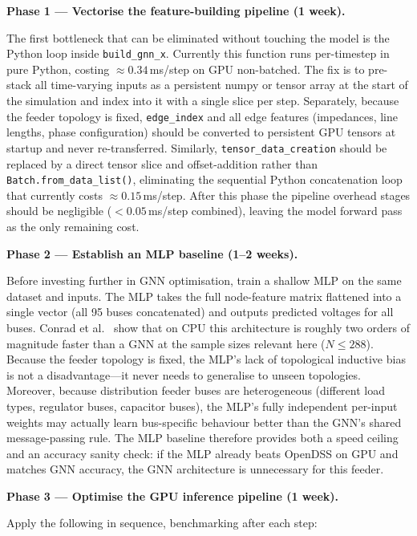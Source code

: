 \documentclass[11pt]{article}
\begin{document}
\medskip
\noindent\textbf{Phase 1 --- Vectorise the feature-building pipeline (1 week).}

The first bottleneck that can be eliminated without touching the model is
the Python loop inside \texttt{build\_gnn\_x}.  Currently this function
runs per-timestep in pure Python, costing ${\approx}0.34$\,ms/step on GPU
non-batched.  The fix is to pre-stack all time-varying inputs as a
persistent numpy or tensor array at the start of the simulation and index
into it with a single slice per step.  Separately, because the feeder
topology is fixed, \texttt{edge\_index} and all edge features
(impedances, line lengths, phase configuration) should be converted to
persistent GPU tensors at startup and never re-transferred.  Similarly,
\texttt{tensor\_data\_creation} should be replaced by a direct tensor
slice and offset-addition rather than \texttt{Batch.from\_data\_list()},
eliminating the sequential Python concatenation loop that currently costs
${\approx}0.15$\,ms/step.  After this phase the pipeline overhead
stages should be negligible ($<0.05$\,ms/step combined), leaving the
model forward pass as the only remaining cost.

\medskip
\noindent\textbf{Phase 2 --- Establish an MLP baseline (1--2 weeks).}

Before investing further in GNN optimisation, train a shallow MLP on the
same dataset and inputs.  The MLP takes the full node-feature matrix
flattened into a single vector (all 95 buses concatenated) and outputs
predicted voltages for all buses.  Conrad et al.~\cite{Conrad2026}
show that on CPU this architecture is roughly two orders of magnitude
faster than a GNN at the sample sizes relevant here ($N \leq 288$).
Because the feeder topology is fixed, the MLP's lack of topological
inductive bias is not a disadvantage---it never needs to generalise to
unseen topologies.  Moreover, because distribution feeder buses are
heterogeneous (different load types, regulator buses, capacitor buses),
the MLP's fully independent per-input weights may actually learn
bus-specific behaviour better than the GNN's shared message-passing
rule.  The MLP baseline therefore provides both a speed ceiling and an
accuracy sanity check: if the MLP already beats OpenDSS on GPU and
matches GNN accuracy, the GNN architecture is unnecessary for this
feeder.

\medskip
\noindent\textbf{Phase 3 --- Optimise the GPU inference pipeline (1 week).}

Apply the following in sequence, benchmarking after each step:
\end{document}
